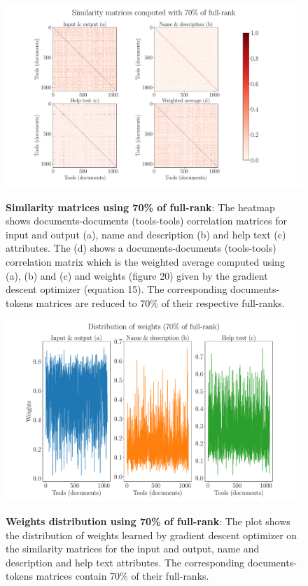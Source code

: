 \begin{figure}[h]
\begin{centering}
    {\includegraphics[scale=0.35]{figures/Similarity_matrices_070.pdf}}
    \caption[Similarity matrices 70\% rank]{\textbf{Similarity matrices using 70\% of full-rank}: The heatmap shows documents-documents (tools-tools) correlation matrices for input and output (a), name and description (b) and help text (c) attributes. The (d) shows a documents-documents (tools-tools) correlation matrix which is the weighted average computed using (a), (b) and (c) and weights (figure 20) given by the gradient descent optimizer (equation 15). The corresponding documents-tokens matrices are reduced to 70\% of their respective full-ranks.}
\end{centering}
\end{figure}

\begin{figure}[h]
\begin{centering}
    {\includegraphics[scale=0.35]{figures/Weights_070.pdf}}
    \caption[Weights distribution 70\% rank]{\textbf{Weights distribution using 70\% of full-rank}: The plot shows the distribution of weights learned by gradient descent optimizer on the similarity matrices for the input and output, name and description and help text attributes. The corresponding documents-tokens matrices contain 70\% of their full-ranks.}
\end{centering}
\end{figure}

